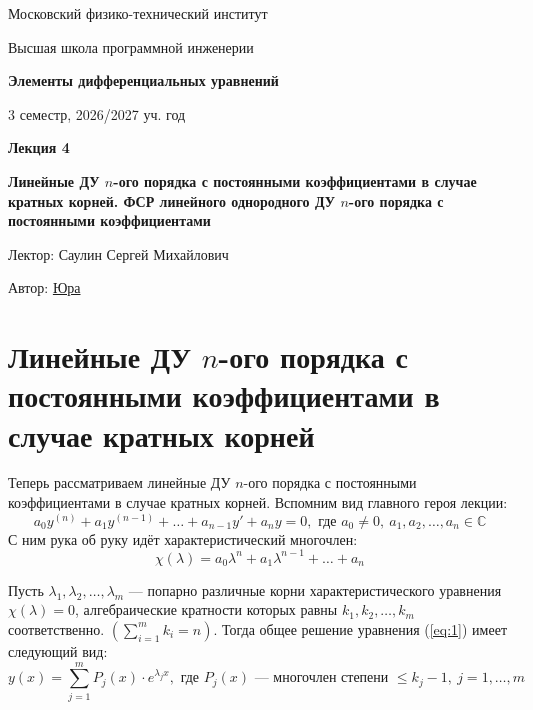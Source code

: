 \documentclass[11pt]{article}
\newcommand{\lectureNumber}{4}
\newcommand{\lectureTitle}{Линейные ДУ $n$-ого порядка с постоянными коэффициентами в случае кратных корней. ФСР линейного однородного ДУ $n$-ого порядка с постоянными коэффициентами}
\newcommand{\courseName}{Элементы дифференциальных уравнений}
\newcommand{\semester}{3 семестр, 2026/2027 уч. год}
\begin{document}
\begin{titlepage}
    \centering
    
    {\large Московский физико-технический институт \par}
    {\large Высшая школа программной инженерии \par}
    \vspace{2cm}

    {\Large \textbf{\courseName} \par}
    {\large \semester \par}
    
    \vspace*{\fill}

    {\Huge \textbf{Лекция \lectureNumber} \par}
    {\Huge \textbf{\lectureTitle} \par}
    
    \vspace*{\fill}
    
    {\large Лектор: Саулин Сергей Михайлович \par}
    {\large Автор: \href{https://t.me/ceagest}{Юра} \par}

\end{titlepage}


\section{Линейные ДУ $n$-ого порядка с постоянными коэффициентами в случае кратных корней}

Теперь рассматриваем линейные ДУ $n$-ого порядка с постоянными коэффициентами в случае кратных корней. Вспомним вид главного героя лекции:
\[a_0  y^{(n)} + a_1  y^{(n - 1)} + \dots + a_{n - 1} y' + a_n  y = 0, \text{ где } a_0 \neq 0, \ a_1, a_2, \dots, a_n \in \mathbb{C} \tag{1} \label{eq:1}\]
С ним рука об руку идёт характеристический многочлен:
\[\chi(\lambda) = a_0  \lambda^n + a_1  \lambda^{n-1} + \dots + a_n \tag{2} \label{eq:2}\]

\begin{theorem}
    Пусть $\lambda_1, \lambda_2, \dots, \lambda_m$ --- попарно различные корни характеристического уравнения $\chi(\lambda) = 0$, алгебраические
    кратности которых равны $k_1, k_2, \dots, k_m$ соответственно. $\displaystyle \left(\sum_{i = 1}^{m} k_i = n\right)$. Тогда общее решение
    уравнения (\ref{eq:1}) имеет следующий вид: \[\tag{3} \label{eq:3} y(x) = \sum_{j = 1}^{m} P_j(x) \cdot e^{\lambda_j x}, \text{ где } P_j(x) 
    \text{ --- многочлен степени } \leq k_j - 1, \ j = 1, \dots, m\]
\end{theorem}
\end{document}
